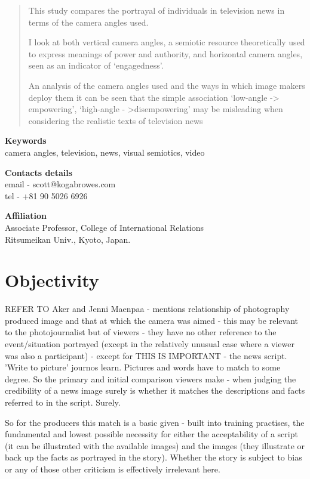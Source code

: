 
\def\mytitle{Interpretation of camera angles in television news}
\def\myauthor{Scott Koga-Browes}


\begin{abstract}
\label{abstract}
\noindent
This study compares the portrayal of individuals in television news in terms of the camera angles used.

I look at both vertical camera angles, a semiotic resource theoretically used to express meanings of power and authority, and horizontal camera angles, seen as an indicator of ‘engagedness’.

An analysis of the camera angles used and the ways in which image makers deploy them it can be seen that the simple association ‘low-angle -> empowering’, ‘high-angle - >disempowering’ may be misleading when considering the realistic texts of television news
\end{abstract}

\noindent
{\bf Keywords}\\
camera angles, television, news, visual semiotics, video
\medskip

\noindent
{\bf Contacts details}\\
email - scott@kogabrowes.com\\
tel - +81 90 5026 6926
\medskip

\noindent
{\bf Affiliation}\\
Associate Professor, College of International Relations\\
Ritsumeikan Univ., Kyoto, Japan.

\section{Objectivity}

\blue
REFER TO Aker and Jenni Maenpaa - mentions relationship of photography produced image and that at which the camera was aimed - this may be relevant to the photojournalist but of viewers - they have no other reference to the event/situation portrayed (except in the relatively unusual case where a viewer was also a participant) - except for THIS IS IMPORTANT - the news script. 'Write to picture' journos learn. Pictures and words have to match to some degree. So the primary and initial comparison viewers make - when judging the credibility of a news image surely is whether it matches the descriptions and facts referred to in the script. Surely. 

So for the producers this match is a basic given - built into training practises, the fundamental and lowest possible necessity for either the acceptability of a script (it can be illustrated with the available images) and the images (they illustrate or back up the facts as portrayed in the story). Whether the story is subject to bias or any of those other criticism is effectively irrelevant here. 


